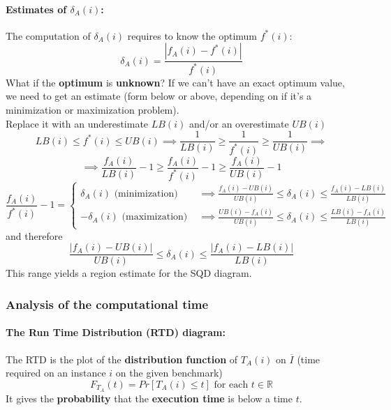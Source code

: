 \paragraph{Estimates of $\delta_A (i)$:} The computation of $\delta_A (i)$ requires to know the optimum $f^\ast (i)$:
$$ \delta_A (i) = \frac{|f_A (i) - f^\ast (i)|}{f^\ast (i)}$$
What if the \textbf{optimum} is \textbf{unknown}? If we can't have an exact optimum value, we need to get an estimate (form below or above, depending on if it's a minimization or maximization problem).\\
Replace it with an underestimate $LB (i )$ and/or an overestimate $UB (i )$
$$ LB (i ) \leq f^\ast (i) \leq UB (i ) \implies \frac{1}{LB(i)} \geq \frac{1}{f^\ast (i)} \geq \frac{1}{UB(i)} \implies $$
$$ \implies \frac{f_A(i)}{LB(i)} - 1 \geq \frac{f_A(i)}{f^\ast (i)} - 1 \geq \frac{f_A(i)}{UB(i)} - 1 $$
$$ \frac{f_A(i)}{f^\ast (i)} - 1 = \begin{cases}
	\delta_A (i) \text{ (minimization) } & \implies \frac{f_A(i) - UB(i)}{UB(i)} \leq \delta_A (i) \leq \frac{f_A(i) - LB(i)}{LB(i)} \\
	- \delta_A (i) \text{ (maximization) } & \implies \frac{UB(i) - f_A(i)}{UB(i)} \leq \delta_A (i) \leq \frac{LB(i) - f_A(i)}{LB(i)}
\end{cases}$$
and therefore
$$ \frac{|f_A(i) - UB(i)|}{UB(i)} \leq \delta_A (i) \leq \frac{|f_A(i) - LB(i)|}{LB(i)} $$
This range yields a region estimate for the SQD diagram.\\

\newpage 

\subsubsection{Analysis of the computational time}
\paragraph{The Run Time Distribution (RTD) diagram:} The RTD is the plot of the \textbf{distribution function} of $T_A (i )$ on $\overline{I}$ (time required on an instance $i$ on the given benchmark)
$$ F_{T_A} (t) = Pr \left[T_A (i) \leq t \right] \text{ for each } t \in \mathbb{R} $$
It gives the \textbf{probability} that the \textbf{execution time} is below a time $t$. \\

